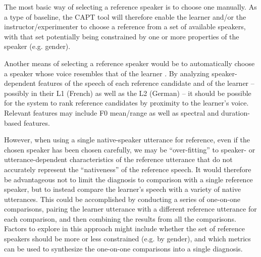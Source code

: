 		
		The most basic way of selecting a reference speaker is to choose one manually.
As a type of baseline, the CAPT tool will therefore enable the learner and/or the instructor/experimenter to choose a reference from a set of available speakers, with that set potentially being constrained by one or more properties of the speaker (e.g. gender). 
	
		
		Another means of selecting a reference speaker would be to automatically choose a speaker whose voice resembles
that of the learner \citep{Probst2002}. By analyzing speaker-dependent features of the speech of each reference candidate and of the learner -- possibly in their L1 (French) as well as the L2 (German) -- it should be possible for the system to rank reference candidates by proximity to the learner's voice. Relevant features may include F0 mean/range as well as spectral and duration-based features.
	
	
	However, when using a single native-speaker utterance for reference, even if the chosen speaker has been chosen carefully, we may be ``over-fitting'' to speaker- or utterance-dependent characteristics of the reference utterance that do not accurately represent the ``nativeness'' of the reference speech. It would therefore be advantageous not to limit the diagnosis to comparison with a single reference speaker, but to instead compare the learner's speech with a variety of native utterances. This could be accomplished by conducting a series of one-on-one comparisons, pairing the learner utterance with a different reference utterance for each comparison, and then combining the results from all the comparisons.  Factors to explore in this approach might include whether the set of reference speakers should be more or less constrained (e.g. by gender), and which metrics can be used to synthesize the one-on-one comparisons into a single diagnosis.
	
